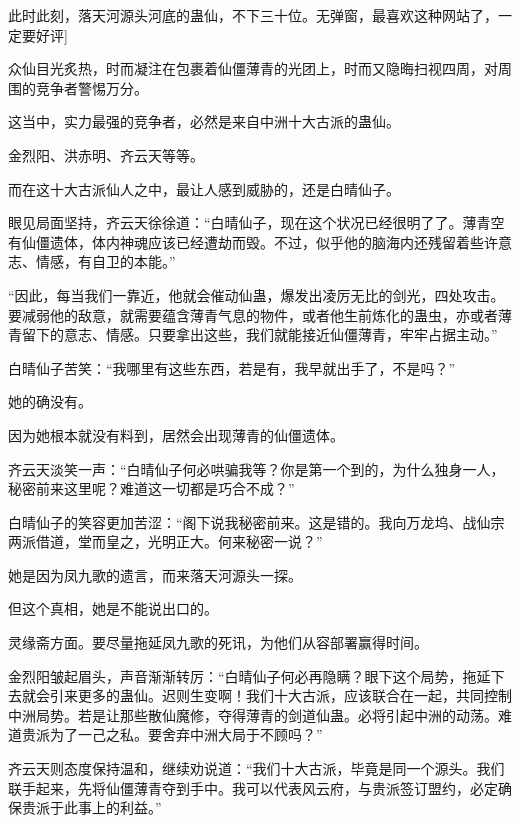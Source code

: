 
\begin{this_body}



此时此刻，落天河源头河底的蛊仙，不下三十位。无弹窗，最喜欢这种网站了，一定要好评]

众仙目光炙热，时而凝注在包裹着仙僵薄青的光团上，时而又隐晦扫视四周，对周围的竞争者警惕万分。

这当中，实力最强的竞争者，必然是来自中洲十大古派的蛊仙。

金烈阳、洪赤明、齐云天等等。

而在这十大古派仙人之中，最让人感到威胁的，还是白晴仙子。

眼见局面坚持，齐云天徐徐道：“白晴仙子，现在这个状况已经很明了了。薄青空有仙僵遗体，体内神魂应该已经遭劫而毁。不过，似乎他的脑海内还残留着些许意志、情感，有自卫的本能。”

“因此，每当我们一靠近，他就会催动仙蛊，爆发出凌厉无比的剑光，四处攻击。要减弱他的敌意，就需要蕴含薄青气息的物件，或者他生前炼化的蛊虫，亦或者薄青留下的意志、情感。只要拿出这些，我们就能接近仙僵薄青，牢牢占据主动。”

白晴仙子苦笑：“我哪里有这些东西，若是有，我早就出手了，不是吗？”

她的确没有。

因为她根本就没有料到，居然会出现薄青的仙僵遗体。

齐云天淡笑一声：“白晴仙子何必哄骗我等？你是第一个到的，为什么独身一人，秘密前来这里呢？难道这一切都是巧合不成？”

白晴仙子的笑容更加苦涩：“阁下说我秘密前来。这是错的。我向万龙坞、战仙宗两派借道，堂而皇之，光明正大。何来秘密一说？”

她是因为凤九歌的遗言，而来落天河源头一探。

但这个真相，她是不能说出口的。

灵缘斋方面。要尽量拖延凤九歌的死讯，为他们从容部署赢得时间。

金烈阳皱起眉头，声音渐渐转厉：“白晴仙子何必再隐瞒？眼下这个局势，拖延下去就会引来更多的蛊仙。迟则生变啊！我们十大古派，应该联合在一起，共同控制中洲局势。若是让那些散仙魔修，夺得薄青的剑道仙蛊。必将引起中洲的动荡。难道贵派为了一己之私。要舍弃中洲大局于不顾吗？”

齐云天则态度保持温和，继续劝说道：“我们十大古派，毕竟是同一个源头。我们联手起来，先将仙僵薄青夺到手中。我可以代表风云府，与贵派签订盟约，必定确保贵派于此事上的利益。”


\end{this_body}
